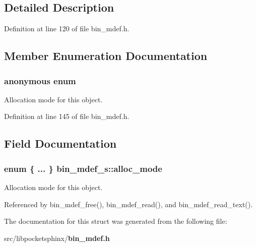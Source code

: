 \subsection{\-Detailed \-Description}


\-Definition at line 120 of file bin\-\_\-mdef.\-h.



\subsection{\-Member \-Enumeration \-Documentation}
\subsubsection[{anonymous enum}]{\setlength{\rightskip}{0pt plus 5cm}anonymous enum}\label{structbin__mdef__s_aecae45462313d38bc6474d8ee57fe9f3}


\-Allocation mode for this object. 



\-Definition at line 145 of file bin\-\_\-mdef.\-h.



\subsection{\-Field \-Documentation}
\subsubsection[{alloc\-\_\-mode}]{\setlength{\rightskip}{0pt plus 5cm}enum \{ ... \}   {\bf bin\-\_\-mdef\-\_\-s\-::alloc\-\_\-mode}}\label{structbin__mdef__s_ab8d852b6cc4f9899da72da03d1607c92}


\-Allocation mode for this object. 



\-Referenced by bin\-\_\-mdef\-\_\-free(), bin\-\_\-mdef\-\_\-read(), and bin\-\_\-mdef\-\_\-read\-\_\-text().



\-The documentation for this struct was generated from the following file\-:\begin{DoxyCompactItemize}
\item 
src/libpocketsphinx/{\bf bin\-\_\-mdef.\-h}\end{DoxyCompactItemize}
